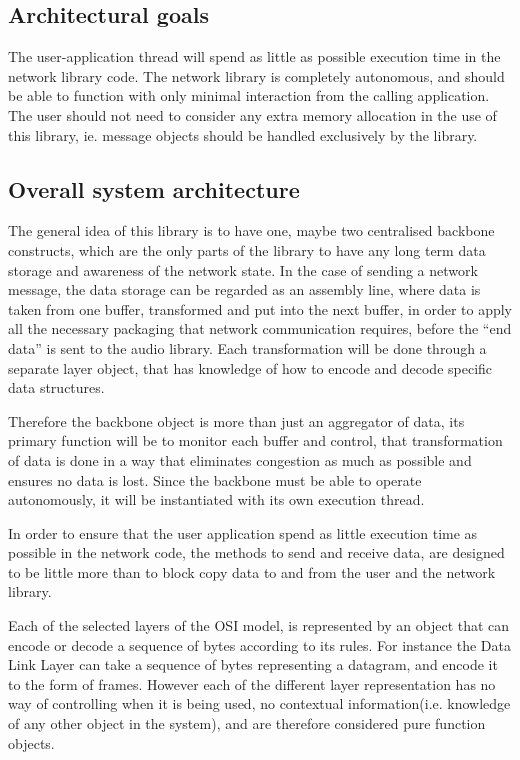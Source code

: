 \subsection{Architectural goals}





The user-application thread will spend as little as possible execution time in the network library code.
The network library is completely autonomous, and should be able to function with only minimal interaction from the calling application.
The user should not need to consider any extra memory allocation in the use of this library, ie. message objects should be handled exclusively by the library.

\subsection{Overall system architecture}
The general idea of this library is to have one, maybe two centralised backbone constructs, which are the only parts of the library to have any long term data storage and awareness of the network state. In the case of sending a network message, the data storage can be regarded as an assembly line, where data is taken from one buffer, transformed and put into the next buffer, in order to apply all the necessary packaging that network communication requires, before the “end data” is sent to the audio library.
Each transformation will be done through a separate layer object, that has knowledge of how to encode and decode specific data structures.

Therefore the backbone object is more than just an aggregator of data, its primary function will be to monitor each buffer and control, that transformation of data is done in a way that eliminates congestion as much as possible and ensures no data is lost. Since the backbone must be able to operate autonomously, it will be instantiated with its own execution thread.

In order to ensure that the user application spend as little execution time as possible in the network code, the methods to send and receive data, are designed to be little more than to block copy data to and from the user and the network library.

Each of the selected layers of the OSI model, is represented by an object that can encode or decode a sequence of bytes according to its rules. For instance the Data Link Layer can take a sequence of bytes representing a datagram, and encode it to the form of frames.
However each of the different layer representation has no way of controlling when it is being used, no contextual information(i.e. knowledge of any other object in the system), and are therefore considered pure function objects.

